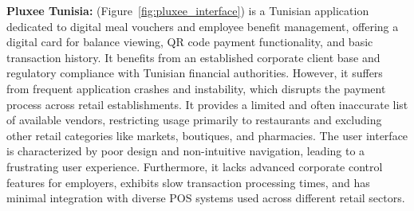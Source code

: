 \textbf{Pluxee Tunisia:} (Figure~\ref{fig:pluxee_interface}) is a Tunisian application dedicated to digital meal vouchers and employee benefit management, offering a digital card for balance viewing, QR code payment functionality, and basic transaction history. It benefits from an established corporate client base and regulatory compliance with Tunisian financial authorities. However, it suffers from frequent application crashes and instability, which disrupts the payment process across retail establishments. It provides a limited and often inaccurate list of available vendors, restricting usage primarily to restaurants and excluding other retail categories like markets, boutiques, and pharmacies. The user interface is characterized by poor design and non-intuitive navigation, leading to a frustrating user experience. Furthermore, it lacks advanced corporate control features for employers, exhibits slow transaction processing times, and has minimal integration with diverse POS systems used across different retail sectors.

\clearpage

